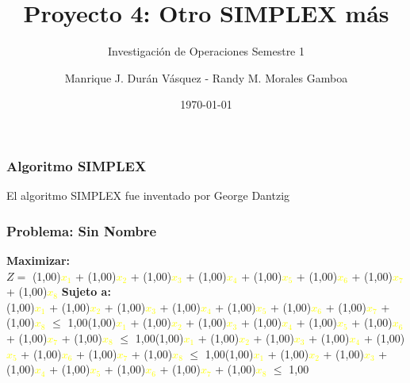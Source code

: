 \documentclass{beamer}
\title{Proyecto 4: Otro SIMPLEX m\'as}
\subtitle{Investigaci\'on de Operaciones \newline Semestre 1}
\author{Manrique J. Dur\'an V\'asquez - Randy M. Morales Gamboa}
\institute{Instituto Tecnol\'ogico de Costa Rica}
\date{\today}
\newcommand\tab[1][1cm]{\hspace*{#1}}
\begin{document}
\begin{frame}
\maketitle
\end{frame}\begin{frame}
\frametitle{Algoritmo SIMPLEX}El algoritmo SIMPLEX fue inventado por George Dantzig\end{frame}
\begin{frame}
\frametitle{Problema: Sin Nombre}
\noindent \textbf{Maximizar:}\\
\tab $Z = $ (1,00)\textcolor{yellow}{$x_{1}$} + (1,00)\textcolor{yellow}{$x_{2}$} + (1,00)\textcolor{yellow}{$x_{3}$} + (1,00)\textcolor{yellow}{$x_{4}$} + (1,00)\textcolor{yellow}{$x_{5}$} + (1,00)\textcolor{yellow}{$x_{6}$} + (1,00)\textcolor{yellow}{$x_{7}$} + (1,00)\textcolor{yellow}{$x_{8}$}\newline\newline
\textbf{Sujeto a:}\\
\tab (1,00)\textcolor{yellow}{$x_{1}$} + (1,00)\textcolor{yellow}{$x_{2}$} + (1,00)\textcolor{yellow}{$x_{3}$} + (1,00)\textcolor{yellow}{$x_{4}$} + (1,00)\textcolor{yellow}{$x_{5}$} + (1,00)\textcolor{yellow}{$x_{6}$} + (1,00)\textcolor{yellow}{$x_{7}$} + (1,00)\textcolor{yellow}{$x_{8}$} $\leq$ 1,00\newline\newline\tab (1,00)\textcolor{yellow}{$x_{1}$} + (1,00)\textcolor{yellow}{$x_{2}$} + (1,00)\textcolor{yellow}{$x_{3}$} + (1,00)\textcolor{yellow}{$x_{4}$} + (1,00)\textcolor{yellow}{$x_{5}$} + (1,00)\textcolor{yellow}{$x_{6}$} + (1,00)\textcolor{yellow}{$x_{7}$} + (1,00)\textcolor{yellow}{$x_{8}$} $\leq$ 1,00\newline\newline\tab (1,00)\textcolor{yellow}{$x_{1}$} + (1,00)\textcolor{yellow}{$x_{2}$} + (1,00)\textcolor{yellow}{$x_{3}$} + (1,00)\textcolor{yellow}{$x_{4}$} + (1,00)\textcolor{yellow}{$x_{5}$} + (1,00)\textcolor{yellow}{$x_{6}$} + (1,00)\textcolor{yellow}{$x_{7}$} + (1,00)\textcolor{yellow}{$x_{8}$} $\leq$ 1,00\newline\newline\tab (1,00)\textcolor{yellow}{$x_{1}$} + (1,00)\textcolor{yellow}{$x_{2}$} + (1,00)\textcolor{yellow}{$x_{3}$} + (1,00)\textcolor{yellow}{$x_{4}$} + (1,00)\textcolor{yellow}{$x_{5}$} + (1,00)\textcolor{yellow}{$x_{6}$} + (1,00)\textcolor{yellow}{$x_{7}$} + (1,00)\textcolor{yellow}{$x_{8}$} $\leq$ 1,00\newline\newline\end{frame}
\end{document}
